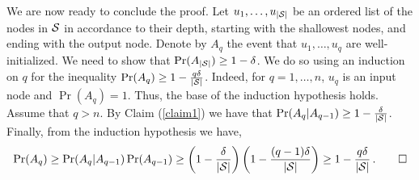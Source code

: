 We are now ready to conclude the proof. Let $u_1,\ldots,u_{|{\cal S}|}$ be an ordered
list of the nodes in ${\cal S}$ in accordance to their depth, starting with the
shallowest nodes, and ending with the output node. Denote by $A_q$ the event
that $u_1,\ldots, u_q$ are well-initialized. We need to show that
$\Pr(A_{|{\cal S}|})\ge 1-\delta$. We do so using an induction on $q$ for the
inequality $\Pr(A_q)\ge 1-\frac{q\delta}{|{\cal S}|}$. Indeed, for $q=1,\ldots,n$,
$u_q$ is an input node and $\Pr(A_q)=1$. Thus, the base of the induction
hypothesis holds. Assume that $q>n$. By Claim (\ref{claim1}) we have that
$\Pr(A_q|A_{q-1})\ge 1-\frac{\delta}{|{\cal S}|}$. Finally, from the induction
hypothesis we have,
\[
\Pr(A_q) \geq \Pr(A_q|A_{q-1})\Pr(A_{q-1}) \ge
	\left(1-\frac{\delta}{|{\cal S}|}\right)
	\left(1-\frac{(q-1)\delta}{|{\cal S}|}\right) \ge
	1-\frac{q\delta}{|{\cal S}|} \,. \qed
\]

